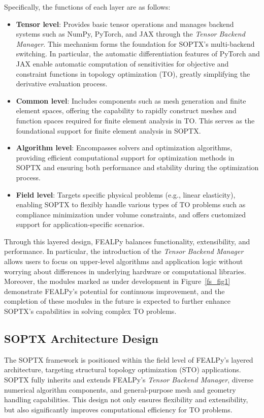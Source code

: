 \documentclass[mathpazo]{cicp}
\begin{document}
Specifically, the functions of each layer are as follows:
\begin{itemize} 
	\item \textbf{Tensor level}: Provides basic tensor operations and manages backend systems such as NumPy, PyTorch, and JAX through the \textit{Tensor Backend Manager}. This mechanism forms the foundation for SOPTX's multi-backend switching. In particular, the automatic differentiation features of PyTorch and JAX enable automatic computation of sensitivities for objective and constraint functions in topology optimization (TO), greatly simplifying the derivative evaluation process.
	\item \textbf{Common level}: Includes components such as mesh generation and finite element spaces, offering the capability to rapidly construct meshes and function spaces required for finite element analysis in TO. This serves as the foundational support for finite element analysis in SOPTX.
	\item \textbf{Algorithm level}: Encompasses solvers and optimization algorithms, providing efficient computational support for optimization methods in SOPTX and ensuring both performance and stability during the optimization process.
	\item \textbf{Field level}: Targets specific physical problems (e.g., linear elasticity), enabling SOPTX to flexibly handle various types of TO problems such as compliance minimization under volume constraints, and offers customized support for application-specific scenarios.
\end{itemize}

Through this layered design, FEALPy balances functionality, extensibility, and performance. In particular, the introduction of the \textit{Tensor Backend Manager} allows users to focus on upper-level algorithms and application logic without worrying about differences in underlying hardware or computational libraries. Moreover, the modules marked as under development in Figure~\ref{fs_fig1} demonstrate FEALPy’s potential for continuous improvement, and the completion of these modules in the future is expected to further enhance SOPTX’s capabilities in solving complex TO problems.

\subsection{SOPTX Architecture Design}
The SOPTX framework is positioned within the field level of FEALPy’s layered architecture, targeting structural topology optimization (STO) applications. SOPTX fully inherits and extends FEALPy’s \textit{Tensor Backend Manager}, diverse numerical algorithm components, and general-purpose mesh and geometry handling capabilities. This design not only ensures flexibility and extensibility, but also significantly improves computational efficiency for TO problems.
\end{document}
